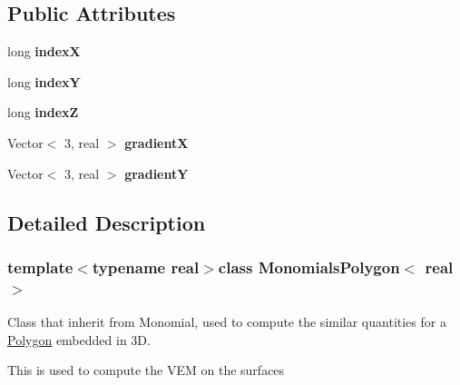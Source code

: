 \subsection*{\-Public \-Attributes}
\begin{DoxyCompactItemize}
\item 
\hypertarget{class_monomials_polygon_a67653a8a7045863c5ce2789e327fdcfd}{long {\bfseries index\-X}}\label{class_monomials_polygon_a67653a8a7045863c5ce2789e327fdcfd}

\item 
\hypertarget{class_monomials_polygon_a2599e7ba98876d6d1c2e7510e4fc7b34}{long {\bfseries index\-Y}}\label{class_monomials_polygon_a2599e7ba98876d6d1c2e7510e4fc7b34}

\item 
\hypertarget{class_monomials_polygon_a2367e9b41cf7615289ac8d30f000e732}{long {\bfseries index\-Z}}\label{class_monomials_polygon_a2367e9b41cf7615289ac8d30f000e732}

\item 
\hypertarget{class_monomials_polygon_a0e83af1a5e822260f79c0fb235480bfd}{\-Vector$<$ 3, real $>$ {\bfseries gradient\-X}}\label{class_monomials_polygon_a0e83af1a5e822260f79c0fb235480bfd}

\item 
\hypertarget{class_monomials_polygon_a13406aff842b61fc89f000697eb4b31b}{\-Vector$<$ 3, real $>$ {\bfseries gradient\-Y}}\label{class_monomials_polygon_a13406aff842b61fc89f000697eb4b31b}

\end{DoxyCompactItemize}


\subsection{\-Detailed \-Description}
\subsubsection*{template$<$typename real$>$class Monomials\-Polygon$<$ real $>$}

\-Class that inherit from \-Monomial, used to compute the similar quantities for a \hyperlink{class_polygon}{\-Polygon} embedded in 3\-D. 

\-This is used to compute the \-V\-E\-M on the surfaces 

